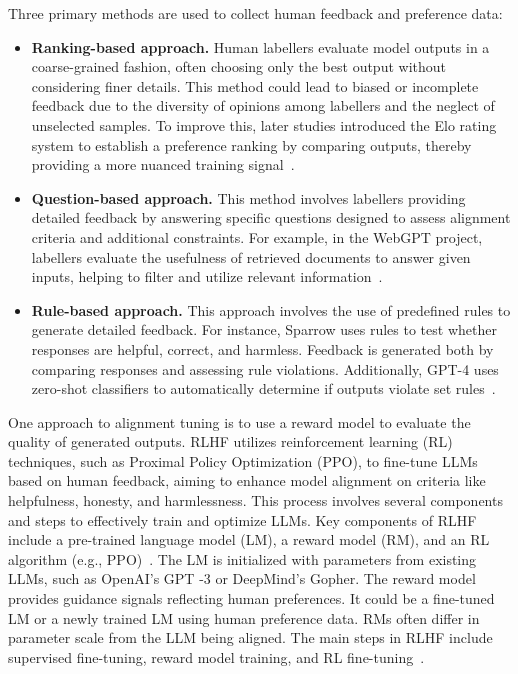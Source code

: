 Three primary methods are used to collect human feedback and preference data:
\begin{itemize}
	\item \textbf{Ranking-based approach.} {
		      Human labellers evaluate model outputs in a coarse-grained fashion, often choosing only the best output without considering finer details. This method could lead to biased or incomplete feedback due to the diversity of opinions among labellers and the neglect of unselected samples. To improve this, later studies introduced the Elo rating system to establish a preference ranking by comparing outputs, thereby providing a more nuanced training signal~\cite{glaese2022improving, ziegler2019fine}.
	      }
	\item \textbf{Question-based approach.} {
		      This method involves labellers providing detailed feedback by answering specific questions designed to assess alignment criteria and additional constraints. For example, in the WebGPT project, labellers evaluate the usefulness of retrieved documents to answer given inputs, helping to filter and utilize relevant information~\cite{nakano2021webgpt}.
	      }
	\item \textbf{Rule-based approach.} {
		      This approach involves the use of predefined rules to generate detailed feedback. For instance, Sparrow uses rules to test whether responses are helpful, correct, and harmless. Feedback is generated both by comparing responses and assessing rule violations. Additionally, GPT-4 uses zero-shot classifiers to automatically determine if outputs violate set rules~\cite{glaese2022improving, radford2023gpt4}.
	      }
\end{itemize}

One approach to alignment tuning is to use a reward model to evaluate the quality of generated outputs.
RLHF utilizes reinforcement learning (RL) techniques, such as Proximal Policy Optimization (PPO), to fine-tune LLMs based on human feedback, aiming to enhance model alignment on criteria like helpfulness, honesty, and harmlessness.
This process involves several components and steps to effectively train and optimize LLMs.
Key components of RLHF include a pre-trained language model (LM), a reward model (RM), and an RL algorithm (e.g., PPO)~\cite{survey}.
The LM is initialized with parameters from existing LLMs, such as OpenAI's GPT -3 or DeepMind's Gopher.
The reward model provides guidance signals reflecting human preferences. It could be a fine-tuned LM or a newly trained LM using human preference data.
RMs often differ in parameter scale from the LLM being aligned.
The main steps in RLHF include supervised fine-tuning, reward model training, and RL fine-tuning~\cite{survey}.

